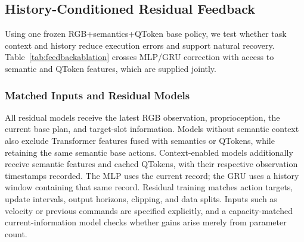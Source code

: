 \subsection{History-Conditioned Residual Feedback}
\label{sec:feedbackexperiments}
Using one frozen RGB+semantics+QToken base policy, we test whether task context and history reduce execution errors and support natural recovery.
Table~\ref{tab:feedbackablation} crosses MLP/GRU correction with access to semantic and QToken features, which are supplied jointly.

\subsubsection{Matched Inputs and Residual Models}
All residual models receive the latest RGB observation, proprioception, the current base plan, and target-slot information.
Models without semantic context also exclude Transformer features fused with semantics or QTokens, while retaining the same semantic base actions.
Context-enabled models additionally receive semantic features and cached QTokens, with their respective observation timestamps recorded.
The MLP uses the current record; the GRU uses a history window containing that same record.
Residual training matches action targets, update intervals, output horizons, clipping, and data splits.
Inputs such as velocity or previous commands are specified explicitly, and a capacity-matched current-information model checks whether gains arise merely from parameter count.

